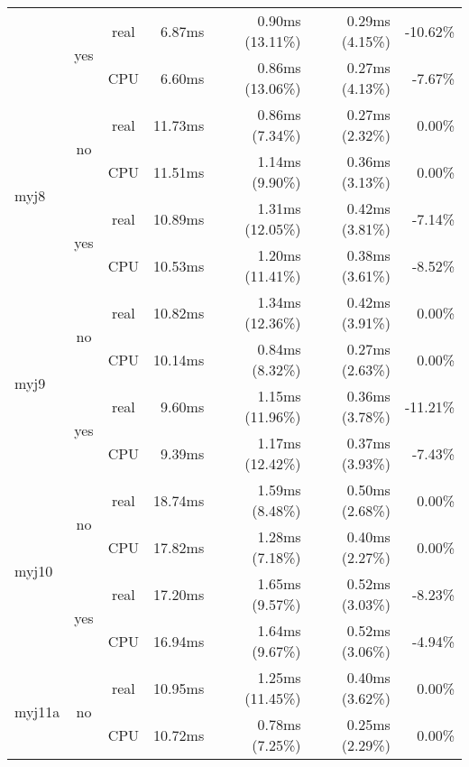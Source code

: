 \documentclass[en]{pracamgr}
\begin{document}
\begin{appendices}
\begin{small}
\begin{longtable}{|l|c|c|r|r|r|r|}
                          \cline{2-7}
                          & \multirow{2}{*}{yes} & real & 6.87ms & 0.90ms (13.11\%) & 0.29ms (4.15\%) & -10.62\% \\*
                          &                      & CPU  & 6.60ms & 0.86ms (13.06\%) & 0.27ms (4.13\%) & -7.67\% \\
\hline
\multirow{4}{*}{myj8}     & \multirow{2}{*}{no}  & real & 11.73ms & 0.86ms (7.34\%) & 0.27ms (2.32\%) & 0.00\% \\*
                          &                      & CPU  & 11.51ms & 1.14ms (9.90\%) & 0.36ms (3.13\%) & 0.00\% \\*
                          \cline{2-7}
                          & \multirow{2}{*}{yes} & real & 10.89ms & 1.31ms (12.05\%) & 0.42ms (3.81\%) & -7.14\% \\*
                          &                      & CPU  & 10.53ms & 1.20ms (11.41\%) & 0.38ms (3.61\%) & -8.52\% \\
\hline
\multirow{4}{*}{myj9}     & \multirow{2}{*}{no}  & real & 10.82ms & 1.34ms (12.36\%) & 0.42ms (3.91\%) & 0.00\% \\*
                          &                      & CPU  & 10.14ms & 0.84ms (8.32\%) & 0.27ms (2.63\%) & 0.00\% \\*
                          \cline{2-7}
                          & \multirow{2}{*}{yes} & real & 9.60ms & 1.15ms (11.96\%) & 0.36ms (3.78\%) & -11.21\% \\*
                          &                      & CPU  & 9.39ms & 1.17ms (12.42\%) & 0.37ms (3.93\%) & -7.43\% \\
\hline
\multirow{4}{*}{myj10}    & \multirow{2}{*}{no}  & real & 18.74ms & 1.59ms (8.48\%) & 0.50ms (2.68\%) & 0.00\% \\*
                          &                      & CPU  & 17.82ms & 1.28ms (7.18\%) & 0.40ms (2.27\%) & 0.00\% \\*
                          \cline{2-7}
                          & \multirow{2}{*}{yes} & real & 17.20ms & 1.65ms (9.57\%) & 0.52ms (3.03\%) & -8.23\% \\*
                          &                      & CPU  & 16.94ms & 1.64ms (9.67\%) & 0.52ms (3.06\%) & -4.94\% \\
\hline
\multirow{4}{*}{myj11a}   & \multirow{2}{*}{no}  & real & 10.95ms & 1.25ms (11.45\%) & 0.40ms (3.62\%) & 0.00\% \\*
                          &                      & CPU  & 10.72ms & 0.78ms (7.25\%) & 0.25ms (2.29\%) & 0.00\% \\*

\end{longtable}
\end{small}
\end{appendices}
\end{document}
